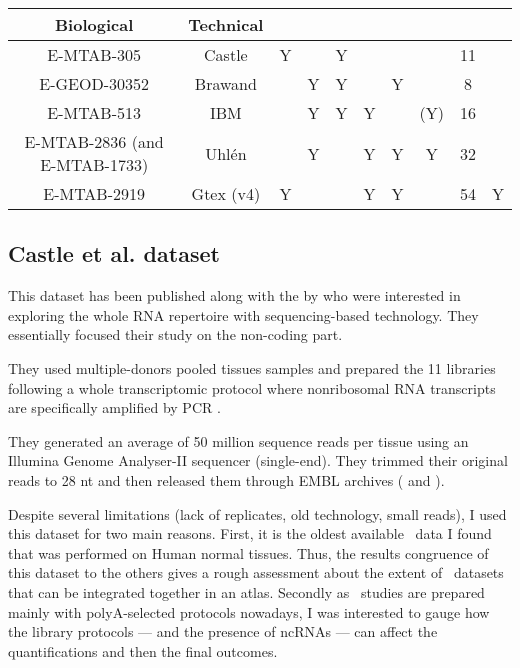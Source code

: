 \begin{sidewaystable}
\begin{tabular}{@{}cccccccccc@{}}
            \multicolumn{1}{c|}{Biological} & \multicolumn{1}{c|}{Technical} &
            \multicolumn{1}{c|}{} &  \\
       \midrule
       E-MTAB-305 & Castle & Y &  & Y &  &  &  & 11 &  \\
       E-GEOD-30352 & Brawand &  & Y & Y &  & Y &  & 8 &  \\
       E-MTAB-513 & IBM &  & Y & Y & Y &  & (Y) & 16 &  \\
       E-MTAB-2836 \footnotesize{(and E-MTAB-1733)}& Uhlén &  & Y &  & Y & Y & Y & 32 &  \\
       E-MTAB-2919 & Gtex (v4)  & Y &  &  & Y & Y &  & 54 & Y \\
       \bottomrule
       \end{tabular}
\end{sidewaystable}

\subsection{Castle et al. dataset}

This dataset has been published along with the 
by \citet{castleData} who were interested in exploring the whole RNA repertoire
with sequencing-based technology. They essentially focused their study
on the non-coding part.

They used multiple-donors pooled tissues samples
and prepared the 11 libraries following a whole transcriptomic protocol
where nonribosomal \gls{RNA} transcripts are
specifically amplified by \gls{PCR} \citep{Armour:2009}.

They generated an average of 50 million sequence reads per tissue
using an Illumina Genome Analyser-II sequencer (single-end).
They trimmed their original reads to 28 \gls{nt}
and then released them through EMBL archives (
and ).

Despite several limitations (lack of replicates, old technology, small reads),
I used this dataset for two main reasons. First, it is the oldest available
\Rnaseq\ data I found that was performed on Human normal tissues. Thus, the
results congruence of this dataset to the others gives a rough assessment about
the extent of \Rnaseq\ datasets that can be integrated together in an atlas.
Secondly as \Rnaseq\ studies are prepared mainly with polyA-selected protocols
nowadays, I was interested to gauge how the library protocols --- and the
presence of \glspl{ncRNA} --- can affect the quantifications and then the final
outcomes.


